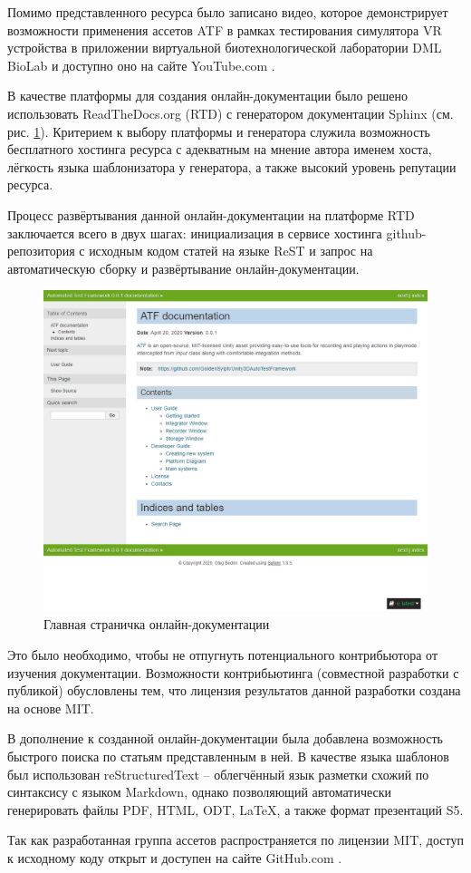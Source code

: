 Помимо представленного ресурса было записано видео, которое демонстрирует возможности применения ассетов ATF в рамках тестирования симулятора VR устройства в приложении виртуальной биотехнологической лаборатории DML BioLab \cite{biolab} и доступно оно на сайте YouTube.com \cite{video}.

В качестве платформы для создания онлайн-документации было решено использовать ReadTheDocs.org (RTD) с генератором документации Sphinx (см. рис. \ref{online_docs}). Критерием к выбору платформы и генератора служила возможность бесплатного хостинга ресурса с адекватным на мнение автора именем хоста, лёгкость языка шаблонизатора у генератора, а также высокий уровень репутации ресурса.

Процесс развёртывания данной онлайн-документации на платформе RTD заключается всего в двух шагах: инициализация в сервисе хостинга github-репозитория с исходным кодом статей на языке ReST и запрос на автоматическую сборку и развёртывание онлайн-документации.

\begin{figure}[H]
	\centering
	\includegraphics[width=\linewidth]{online_docs.png}
	\caption{Главная страничка онлайн-документации}
	\label{online_docs}
\end{figure}

Это было необходимо, чтобы не отпугнуть потенциального контрибьютора от изучения документации. Возможности контрибьютинга (совместной разработки с публикой) обусловлены тем, что лицензия результатов данной разработки создана на основе MIT.

В дополнение к созданной онлайн-документации была добавлена возможность быстрого поиска по статьям представленным в ней. В качестве языка шаблонов был использован reStructuredText -- облегчённый язык разметки схожий по синтаксису с языком Markdown, однако позволяющий автоматически генерировать файлы PDF, HTML, ODT, LaTeX, а также формат презентаций S5.

Так как разработанная группа ассетов распространяется по лицензии MIT, доступ к исходному коду открыт и доступен на сайте GitHub.com \cite{git}. 